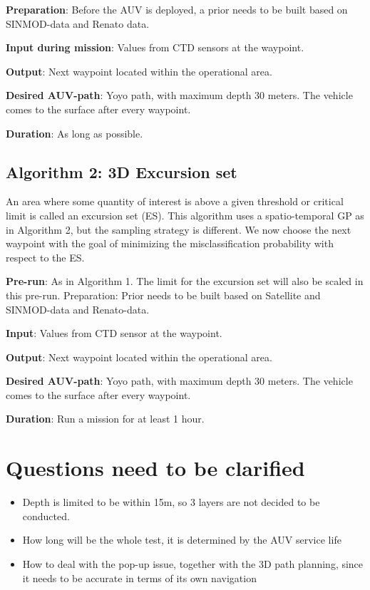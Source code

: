 \documentclass{article}
\begin{document}
\textbf{Preparation}: Before the AUV is deployed, a prior needs to be built based on SINMOD-data and Renato data.

\textbf{Input during mission}: Values from CTD sensors at the waypoint.

\textbf{Output}: Next waypoint located within the operational area. 

\textbf{Desired AUV-path}:  Yoyo path, with maximum depth 30 meters. The vehicle comes to the surface after every waypoint.

\textbf{Duration}: As long as possible.  


\subsection*{Algorithm 2: 3D Excursion set}
An area where some quantity of interest is above a given threshold or critical limit is called an excursion set (ES). This algorithm uses a spatio-temporal GP as in Algorithm 2, but the sampling strategy is different. We now choose the next waypoint with the goal of minimizing the misclassification probability with respect to the ES. 

\textbf{Pre-run}:  As in Algorithm 1. The limit for the excursion set will also be scaled in this pre-run. 
Preparation: Prior needs to be built based on Satellite and SINMOD-data and Renato-data. 

\textbf{Input}: Values from CTD sensor at the waypoint.

\textbf{Output}: Next waypoint located within the operational area. 

\textbf{Desired AUV-path}:  Yoyo path, with maximum depth 30 meters. The vehicle comes to the surface after every waypoint. 

\textbf{Duration}: Run a mission for at least 1 hour.  


\section*{Questions need to be clarified}
\begin{itemize}
    \item Depth is limited to be within 15m, so 3 layers are not decided to be conducted.
    \item How long will be the whole test, it is determined by the AUV service life
    \item How to deal with the pop-up issue, together with the 3D path planning, since it needs to be accurate in terms of its own navigation
\end{itemize}
\end{document}
